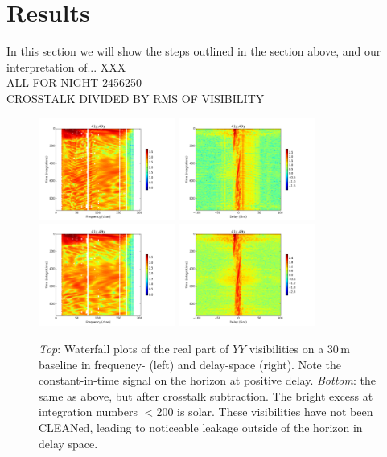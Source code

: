 \documentclass[10pt,a4paper,notitlepage]{article}
\begin{document}
\section{Results}
\label{sec:results}
In this section we will show the steps outlined in the section above, and our interpretation of... XXX\\

ALL FOR NIGHT 2456250\\

CROSSTALK DIVIDED BY RMS OF VISIBILITY

\begin{figure}
\centering
\includegraphics[width=0.4\textwidth]{6250_C.png}
\includegraphics[width=0.4\textwidth]{6250_C_d.png}
\includegraphics[width=0.4\textwidth]{6250_Cx.png}
\includegraphics[width=0.4\textwidth]{6250_Cx_d.png}
\caption{\textit{Top}: Waterfall plots of the real part of $YY$ visibilities on a 30\,m baseline in frequency- (left) and delay-space (right). Note the constant-in-time signal on the horizon at positive delay. \textit{Bottom}: the same as above, but after crosstalk subtraction. The bright excess at integration numbers $<$200 is solar. These visibilities have not been CLEANed, leading to noticeable leakage outside of the horizon in delay space.}
\label{fig:waterfalls}
\end{figure}
\end{document}
